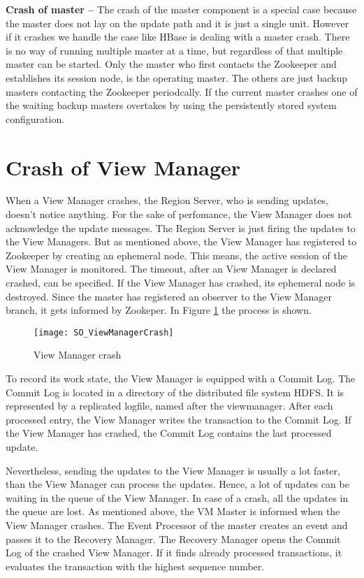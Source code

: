\documentclass[11pt,a4paper,bibtotoc,idxtotoc,headsepline,footsepline,footexclude,BCOR12mm,DIV13]{scrbook}
\begin{document}
\noindent  
\textbf{Crash of master -- }The crash of the master component is a special case because the master does not lay on the update path and it is just a single unit. However if it crashes we  handle the case like HBase is dealing with a master crash. There is no way of running multiple master at a time, but regardless of that multiple master can be started. Only the master who first contacts the Zookeeper and establishes its session node, is the operating master. The others are just backup masters contacting the Zookeeper periodcally. If the current master crashes one of the waiting backup masters overtakes by using the persistently stored system configuration.\\ 

\section{Crash of View Manager}

When a View Manager crashes, the Region Server, who is sending updates, doesn't notice anything. For the sake of perfomance, the View Manager does not acknowledge the update messages. The Region Server is just firing the updates to the View Managers.  
But as mentioned above, the View Manager has registered to Zookeeper by creating an ephemeral node. This means, the active session of the View Manager is monitored. The timeout, after an View Manager is declared crashed, can be specified. If the View Manager has crashed, its ephemeral node is destroyed. Since the master has registered an observer to the View Manager branch, it gets informed by Zookeper. In Figure \ref{fig:viewmanagercrash} the process is shown. \\

\begin{figure}[h!]
  
  \centering
    \texttt{[image: SO\_ViewManagerCrash]}
    \caption{View Manager crash}
    \label{fig:viewmanagercrash}
\end{figure}

To record its work state, the View Manager is equipped with a Commit Log. The Commit Log is located in a directory of the distributed file system HDFS. It is represented by a replicated logfile, named after the viewmanager. After each processed entry, the View Manager writes the transaction to the Commit Log. If the View Manager has crashed, the Commit Log contains the last processed update. 

Nevertheless, sending the updates to the View Manager is usually a lot faster, than the View Manager can process the updates. Hence, a lot of updates can be waiting in the queue of the View Manager. In case of a crash, all the updates in the queue are lost. As mentioned above, the VM Master is informed when the View Manager crashes. The Event Processor of the master creates an event and passes it to the Recovery Manager. The Recovery Manager opens the Commit Log of the crashed View Manager. If it finds already processed transactions, it evaluates the transaction with the highest sequence number. 
\end{document}
